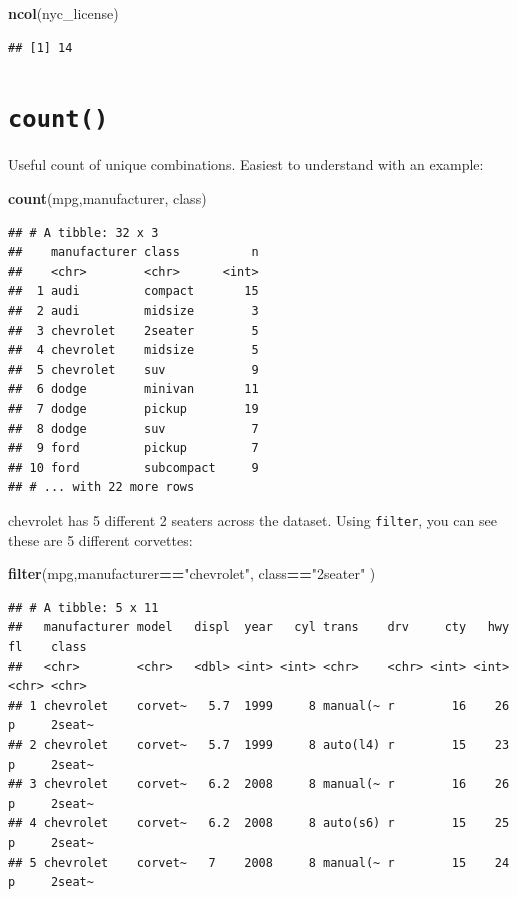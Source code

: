\documentclass[
]{book}
\newenvironment{Shaded}{\begin{snugshade}}{\end{snugshade}}
\newcommand{\KeywordTok}[1]{\textcolor[rgb]{0.13,0.29,0.53}{\textbf{#1}}}
\newcommand{\NormalTok}[1]{#1}
\newcommand{\OperatorTok}[1]{\textcolor[rgb]{0.81,0.36,0.00}{\textbf{#1}}}
\newcommand{\StringTok}[1]{\textcolor[rgb]{0.31,0.60,0.02}{#1}}
\begin{document}
\begin{Shaded}
\begin{Highlighting}[]
\KeywordTok{ncol}\NormalTok{(nyc_license)}
\end{Highlighting}
\end{Shaded}

\begin{verbatim}
## [1] 14
\end{verbatim}

\hypertarget{count}{%
\section{\texorpdfstring{\texttt{count()}}{count()}}\label{count}}

Useful count of unique combinations.
Easiest to understand with an example:

\begin{Shaded}
\begin{Highlighting}[]
\KeywordTok{count}\NormalTok{(mpg,manufacturer, class)}
\end{Highlighting}
\end{Shaded}

\begin{verbatim}
## # A tibble: 32 x 3
##    manufacturer class          n
##    <chr>        <chr>      <int>
##  1 audi         compact       15
##  2 audi         midsize        3
##  3 chevrolet    2seater        5
##  4 chevrolet    midsize        5
##  5 chevrolet    suv            9
##  6 dodge        minivan       11
##  7 dodge        pickup        19
##  8 dodge        suv            7
##  9 ford         pickup         7
## 10 ford         subcompact     9
## # ... with 22 more rows
\end{verbatim}

chevrolet has 5 different 2 seaters across the dataset. Using \texttt{filter}, you can
see these are 5 different corvettes:

\begin{Shaded}
\begin{Highlighting}[]
\KeywordTok{filter}\NormalTok{(mpg,manufacturer}\OperatorTok{==}\StringTok{"chevrolet"}\NormalTok{, class}\OperatorTok{==}\StringTok{"2seater"}\NormalTok{ )}
\end{Highlighting}
\end{Shaded}

\begin{verbatim}
## # A tibble: 5 x 11
##   manufacturer model   displ  year   cyl trans    drv     cty   hwy fl    class 
##   <chr>        <chr>   <dbl> <int> <int> <chr>    <chr> <int> <int> <chr> <chr> 
## 1 chevrolet    corvet~   5.7  1999     8 manual(~ r        16    26 p     2seat~
## 2 chevrolet    corvet~   5.7  1999     8 auto(l4) r        15    23 p     2seat~
## 3 chevrolet    corvet~   6.2  2008     8 manual(~ r        16    26 p     2seat~
## 4 chevrolet    corvet~   6.2  2008     8 auto(s6) r        15    25 p     2seat~
## 5 chevrolet    corvet~   7    2008     8 manual(~ r        15    24 p     2seat~
\end{verbatim}
\end{document}
